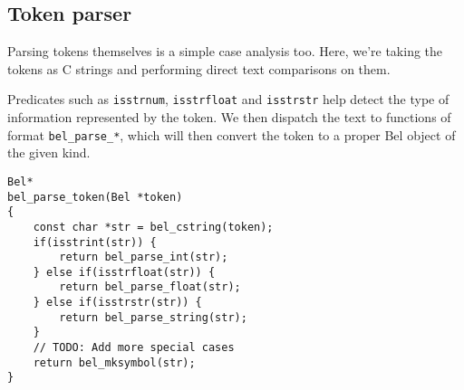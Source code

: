 \documentclass[openright,a4paper,twoside,12pt]{memoir}
\begin{document}
\subsection{Token parser}
\label{sec:org39560e1}

Parsing tokens themselves  is a simple case analysis  too. Here, we're
taking the tokens as C  strings and performing direct text comparisons
on them.

Predicates such as  \texttt{isstrnum}, \texttt{isstrfloat} and \texttt{isstrstr}  help detect the
type of  information represented  by the token.  We then  dispatch the
text to functions  of format \texttt{bel\_parse\_*}, which will  then convert the
token to a proper Bel object of the given kind.

\begin{verbatim}
Bel*
bel_parse_token(Bel *token)
{
    const char *str = bel_cstring(token);
    if(isstrint(str)) {
        return bel_parse_int(str);
    } else if(isstrfloat(str)) {
        return bel_parse_float(str);
    } else if(isstrstr(str)) {
        return bel_parse_string(str);
    }
    // TODO: Add more special cases
    return bel_mksymbol(str);
}
\end{verbatim}
\end{document}
